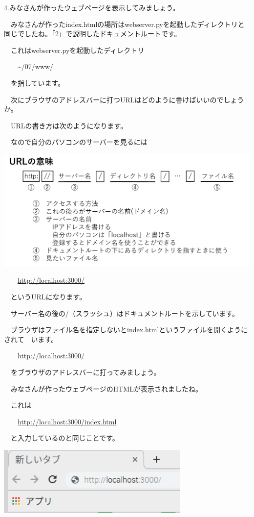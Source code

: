\documentclass[a4paper,12pt,dvipdfmx]{jarticle}
\begin{document}
\clearpage


4.みなさんが作ったウェブページを表示してみましょう。

\ \ みなさんが作ったindex.htmlの場所はwebserver.pyを起動したディレクトリと同じでしたね。「2」で説明したドキュメントルートです。

\ \ これはwebserver.pyを起動したディレクトリ

\ \ 　{\textasciitilde}/07/www/

\ \ を指しています。


\bigskip

\ \ 次にブラウザのアドレスバーに打つURLはどのように書けばいいのでしょうか。

\ \ URLの書き方は次のようになります。

\ \ なので自分のパソコンのサーバーを見るには

\centering
\includegraphics[width=13.894cm]{ome7-img040.png}
\flushleft

\ \ 　\url{http://localhost:3000/}

\ \ というURLになります。

\ \ サーバー名の後の/（スラッシュ）はドキュメントルートを示しています。

\ \ ブラウザはファイル名を指定しないとindex.htmlというファイルを開くようにされて\ \ います。

\ \ 　\url{http://localhost:3000/}

\ \ をブラウザのアドレスバーに打ってみましょう。

\ \ みなさんが作ったウェブページのHTMLが表示されましたね。

\ \ これは

\ \ 　\url{http://localhost:3000/index.html}

\ \ と入力しているのと同じことです。

\bigskip

\centering
\includegraphics[width=9.551cm]{ome7-img041.png}
\flushleft
\end{document}
